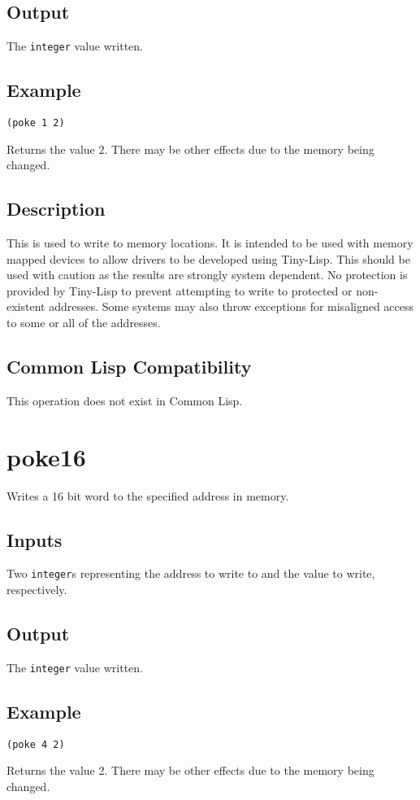 \documentclass[10pt, openany]{book}
\newcommand{\datatype}[1]{\texttt{#1}}
\newcommand{\tl}{Tiny-Lisp}
\newcommand{\cl}{Common Lisp}
\begin{document}
\subsection{Output}
The \datatype{integer} value written.
\subsection{Example}
\begin{lstlisting}
(poke 1 2)
\end{lstlisting}
Returns the value 2.  There may be other effects due to the memory being changed.
\subsection{Description}
This is used to write to memory locations.  It is intended to be used with memory mapped devices to allow drivers to be developed using \tl{}.  This should be used with caution as the results are strongly system dependent.  No protection is provided by \tl{} to prevent attempting to write to protected or non-existent addresses.  Some systems may also throw exceptions for misaligned access to some or all of the addresses.
\subsection{Common Lisp Compatibility}
This operation does not exist in \cl.

\section{poke16}
Writes a 16 bit word to the specified address in memory.
\subsection{Inputs}
Two \datatype{integer}s representing the address to write to and the value to write, respectively.
\subsection{Output}
The \datatype{integer} value written.
\subsection{Example}
\begin{lstlisting}
(poke 4 2)
\end{lstlisting}
Returns the value 2.  There may be other effects due to the memory being changed.
\end{document}
